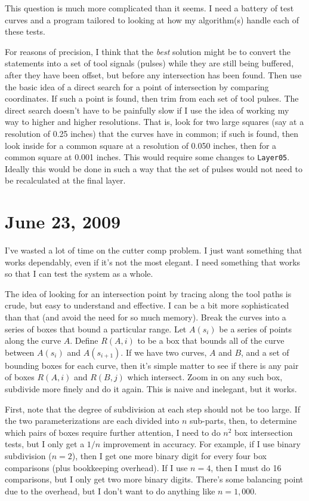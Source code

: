 \documentclass[titlepage,oneside,10pt]{article}
\begin{document}
This question is much more complicated than it seems. I need a battery
of test curves and a program tailored to looking at how my
algorithm(s) handle each of these tests.

For reasons of precision, I think that the \emph{best} solution might
be to convert the statements into a set of tool signals (pulses) while
they are still being buffered, after they have been offset, but before
any intersection has been found. Then use the basic idea of a direct
search for a point of intersection by comparing coordinates. If such a
point is found, then trim from each set of tool pulses. The direct
search doesn't have to be painfully slow if I use the idea of working
my way to higher and higher resolutions. That is, look for two large
squares (say at a resolution of 0.25 inches) that the curves have in
common; if such is found, then look inside for a common square at a
resolution of 0.050 inches, then for a common square at 0.001
inches. This would require some changes to {\tt Layer05}. Ideally this
would be done in such a way that the set of pulses would not need to
be recalculated at the final layer.

\section{June 23, 2009}

I've wasted a lot of time on the cutter comp problem. I just want
something that works dependably, even if it's not the most
elegant. I need something that works so that I can test the system as
a whole. 

The idea of looking for an intersection point by tracing along the
tool paths is crude, but easy to understand and effective. I can be a
bit more sophisticated than that (and avoid the need for so much
memory). Break the curves into a series of boxes that bound a
particular range. Let $A(s_i)$ be a series of points along the curve
$A$. Define $R(A,i)$ to be a box that bounds all of the curve between
$A(s_i)$ and $A(s_{i+1})$. If we have two curves, $A$ and $B$, and a
set of bounding boxes for each curve, then it's simple matter to see
if there is any pair of boxes $R(A,i)$ and $R(B,j)$ which
intersect. Zoom in on any such box, subdivide more finely and do it
again. This is naive and inelegant, but it works. 

First, note that the degree of subdivision at each step should not be
too large. If the two parameterizations are each divided into $n$
sub-parts, then, to determine which pairs of boxes require further
attention, I need to do $n^2$ box intersection tests, but I only get a
$1/n$ improvement in accuracy. For example, if I use binary
subdivision ($n=2$), then I get one more binary digit for every four
box comparisons (plus bookkeeping overhead). If I use $n=4$, then I
must do 16 comparisons, but I only get two more binary digits. There's
some balancing point due to the overhead, but I don't want to do
anything like $n=1,000$.
\end{document}
